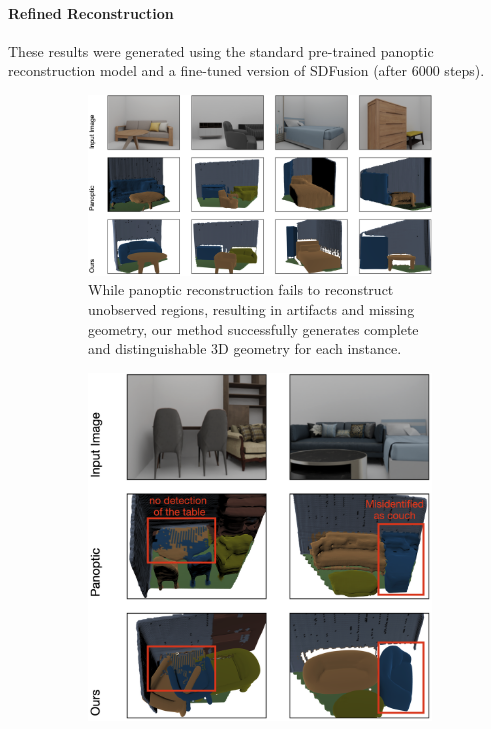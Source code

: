 \vspace*{-3mm}
\paragraph{Refined Reconstruction}
These results were generated using the standard pre-trained panoptic reconstruction model and a fine-tuned version of SDFusion (after 6000 steps). 

\begin{figure}%
  \begin{subfigure}[t]{109mm}
    \includegraphics[width=\linewidth]{images/image1.png}
    \caption{While panoptic reconstruction fails to reconstruct unobserved regions, resulting in artifacts and missing geometry, our method successfully generates complete and distinguishable 3D geometry for each instance.}\label{fig:comparison_good}
  \end{subfigure}
  \qquad
  \begin{subfigure}[t]{56mm}
    \includegraphics[width=\linewidth]{images/image2.png}

\end{subfigure}
\end{figure}
